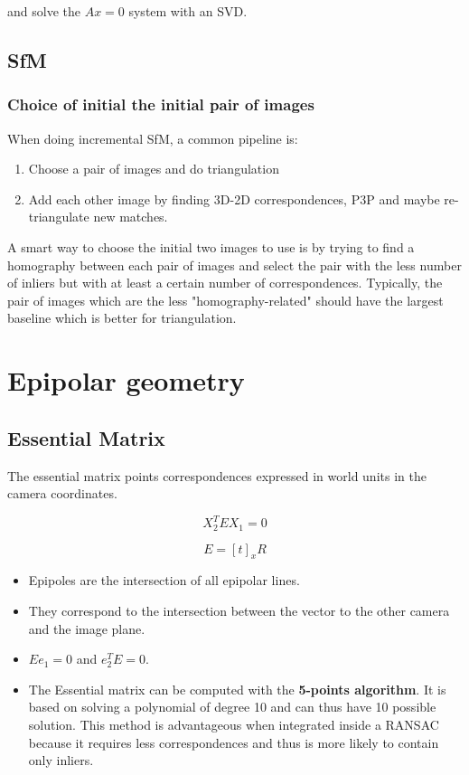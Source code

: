and solve the $Ax=0$ system with an SVD.


\subsection{SfM}

\subsubsection{Choice of initial the initial pair of images}

When doing incremental SfM, a common pipeline is:
\begin{enumerate}
    \item Choose a pair of images and do triangulation
    \item Add each other image by finding 3D-2D correspondences, P3P and maybe re-triangulate new matches.
\end{enumerate}

A smart way to choose the initial two images to use is by trying to find a homography between each pair of images and select the pair with the less number of inliers but with at least a certain number of correspondences. Typically, the pair of images which are the less "homography-related" should have the largest baseline which is better for triangulation.




\section{Epipolar geometry}
\subsection{Essential Matrix}

The essential matrix points correspondences expressed in world units in the camera coordinates.

\begin{equation}
    X_2^T E X_1 = 0
\end{equation}

\begin{equation}
    E = [t]_x R
\end{equation}

\begin{itemize}
    \item Epipoles are the intersection of all epipolar lines.
    \item They correspond to the intersection between the vector to the other camera and the image plane.
    \item $Ee_1 = 0$ and $e_2^TE=0$.
    \item The Essential matrix can be computed with the \textbf{5-points algorithm}. It is based on solving a polynomial of degree 10 and can thus have 10 possible solution. This method is advantageous when integrated inside a RANSAC because it requires less correspondences and thus is more likely to contain only inliers.
\end{itemize}

